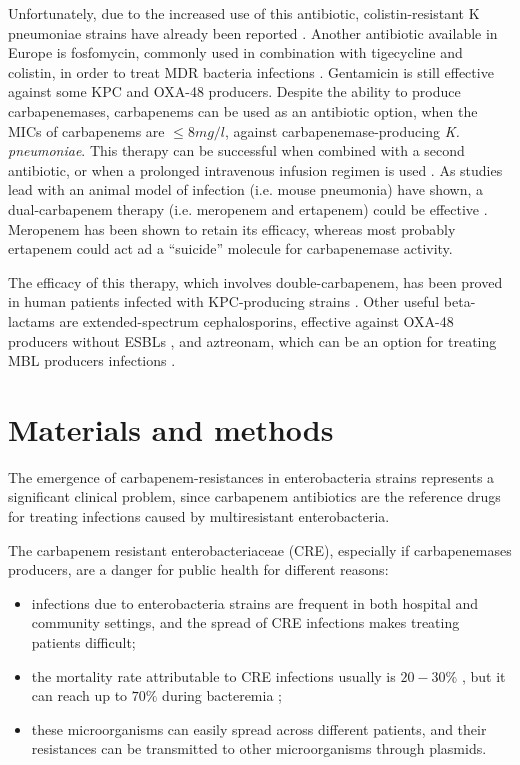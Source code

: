 \documentclass[11pt]{report}
\begin{document}
Unfortunately, due to the increased use of this antibiotic, 
colistin-resistant K pneumoniae strains have already been reported \cite{mammina2012ongoing}.
Another antibiotic available in Europe is fosfomycin, commonly used in combination with tigecycline and colistin, in order to treat MDR bacteria infections \cite{pontikis2014outcomes}.
Gentamicin is still effective against some KPC and OXA-48
producers.
Despite the ability to produce carbapenemases, carbapenems can be used as an antibiotic option, when the MICs of carbapenems are $\le 8mg/l$, against carbapenemase-producing \emph{K. pneumoniae}.
This therapy can be successful when combined with a second antibiotic, or when a prolonged intravenous infusion regimen is used \cite{tzouvelekis2014treating, daikos2014carbapenemase, tumbarello2012predictors}.
As studies lead with an animal model of infection (i.e. mouse pneumonia) have shown, a dual-carbapenem therapy (i.e. meropenem and ertapenem) could be effective \cite{wiskirchen2014vivo}.
Meropenem has been shown to retain its efficacy, whereas most probably ertapenem could act ad a ``suicide'' molecule for carbapenemase activity.

The efficacy of this therapy, which involves double-carbapenem, has been proved in human patients infected with KPC-producing strains \cite{giamarellou2013effectiveness}.
Other useful beta-lactams are extended-spectrum cephalosporins, effective against OXA-48 producers without ESBLs \cite{mimoz2012broad}, and aztreonam, which can be an option for treating MBL producers infections \cite{nordmann2011emerging}.

\chapter{Materials and methods}

The emergence of carbapenem-resistances in enterobacteria strains represents a significant clinical problem, since carbapenem antibiotics are the reference drugs for treating infections caused by multiresistant enterobacteria.

The carbapenem resistant enterobacteriaceae (CRE), especially if carbapenemases producers, are a danger for public health for different reasons:
\begin{itemize}
\item infections due to enterobacteria strains are frequent in both hospital and community settings, and the spread of CRE infections makes treating patients difficult;
\item the mortality rate attributable to CRE infections usually is $20-30\%$  \cite{carmeli2010controlling}, but it can reach up to $70\%$ during bacteremia \cite{mouloudi2010bloodstream};
\item these microorganisms can easily spread across different patients, and their resistances can be transmitted to other microorganisms through plasmids.
\end{itemize}
\end{document}
